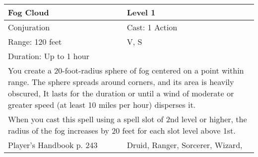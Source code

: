 \documentclass[11pt]{report}
\begin{document}
\begin{table}[H]
	\begin{tabular}{||p{6cm}|p{6cm}||}
		\hline\hline
		\bf{Fog Cloud} & Level 1\\ \hline
		Conjuration & Cast: 1 Action\\ \hline
		Range: 120 feet & V, S\\ \hline
		Duration: Up to 1 hour & \\ \hline
		\multicolumn{2}{||p{12cm}||}{You create a 20-foot-radius sphere of fog centered on a point within range. The sphere spreads around corners, and its area is heavily obscured, It lasts for the duration or until a wind of moderate or greater speed (at least 10 miles per hour) disperses it.}\\ \hline
		\multicolumn{2}{||p{12cm}||}{When you cast this spell using a spell slot of 2nd level or higher, the radius of the fog increases by 20 feet for each slot level above 1st.}\\ \hline
Player's Handbook p. 243 & Druid, Ranger, Sorcerer, Wizard, \\ \hline\hline
	\end{tabular}
\end{table}
\end{document}
